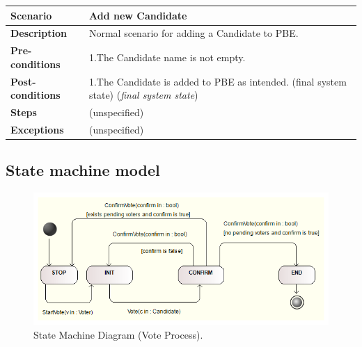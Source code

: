 \documentclass{article}
\begin{document}
\begin{center}
    \begin{tabular}{ | l | p{9cm} |}
    \hline
   \textbf{Scenario}	& \textbf{Add new Candidate }  \\ \hline
    \textbf{Description}	&Normal scenario for adding a Candidate to PBE.\\ \hline
   \textbf{Pre-conditions}	&1.The Candidate name is not empty.
\\ \hline
 \textbf{Post-conditions} & 1.The Candidate is added to PBE as intended. (final system state)  (\textit{final system state}) \\ \hline
   \textbf{Steps} &  (unspecified)
 \\ 
    \hline
\textbf{Exceptions}& 	(unspecified)
 \\ 
    \hline
    \end{tabular}
\end{center}


\subsection{State machine model}
\begin{figure}[H]
\centering
	\includegraphics[width=\textwidth,height=\textheight,keepaspectratio]{state.png}
	\caption{State Machine Diagram (Vote Process).}
	\label{fig:PropProf}
\end{figure}
\end{document}
